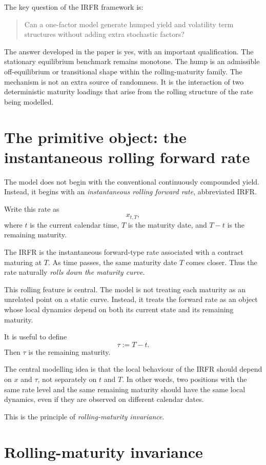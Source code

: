 \documentclass[11pt]{article}
\theoremstyle{plainbreak}
\begin{document}
The key question of the IRFR framework is:
\begin{quote}
Can a one-factor model generate humped yield and volatility term structures without adding extra stochastic factors?
\end{quote}

The answer developed in the paper is yes, with an important qualification. The stationary equilibrium benchmark remains monotone. The hump is an admissible off-equilibrium or transitional shape within the rolling-maturity family. The mechanism is not an extra source of randomness. It is the interaction of two deterministic maturity loadings that arise from the rolling structure of the rate being modelled.

\section{The primitive object: the instantaneous rolling forward rate}

The model does not begin with the conventional continuously compounded yield. Instead, it begins with an \emph{instantaneous rolling forward rate}, abbreviated IRFR.

Write this rate as
\[
x_{t,T},
\]
where \(t\) is the current calendar time, \(T\) is the maturity date, and \(T-t\) is the remaining maturity.

The IRFR is the instantaneous forward-type rate associated with a contract maturing at \(T\). As time passes, the same maturity date \(T\) comes closer. Thus the rate naturally \emph{rolls down the maturity curve}.

This rolling feature is central. The model is not treating each maturity as an unrelated point on a static curve. Instead, it treats the forward rate as an object whose local dynamics depend on both its current state and its remaining maturity.

It is useful to define
\[
\tau := T-t.
\]
Then \(\tau\) is the remaining maturity.

The central modelling idea is that the local behaviour of the IRFR should depend on \(x\) and \(\tau\), not separately on \(t\) and \(T\). In other words, two positions with the same rate level and the same remaining maturity should have the same local dynamics, even if they are observed on different calendar dates.

This is the principle of \emph{rolling-maturity invariance}.

\section{Rolling-maturity invariance}
\end{document}
